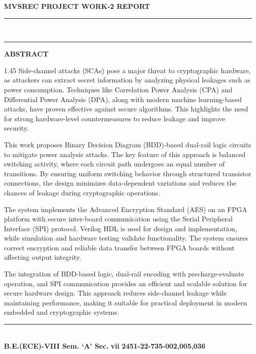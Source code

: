 \documentclass[12pt,a4paper]{article}
\begin{document}
\noindent
{\small\textbf{MVSREC}} \hfill {\small\textbf{PROJECT WORK-2 REPORT}}\\[-0.2cm]
\noindent\rule{\textwidth}{1.8pt}\\[-0.55cm]
\noindent\rule{\textwidth}{0.6pt}

\vspace{1.0cm}

\begin{center}
    {\fontsize{14}{17}\selectfont \textbf{ABSTRACT}}
\end{center}

\vspace{0.6cm}

\begin{spacing}{1.45}
\noindent
Side-channel attacks (SCAs) pose a major threat to cryptographic hardware, as attackers can extract secret information by analyzing physical leakages such as power consumption. Techniques like Correlation Power Analysis (CPA) and Differential Power Analysis (DPA), along with modern machine learning-based attacks, have proven effective against secure algorithms. This highlights the need for strong hardware-level countermeasures to reduce leakage and improve security.

\vspace{0.45cm}

\noindent
This work proposes Binary Decision Diagram (BDD)-based dual-rail logic circuits to mitigate power analysis attacks. The key feature of this approach is balanced switching activity, where each circuit path undergoes an equal number of transitions. By ensuring uniform switching behavior through structured transistor connections, the design minimizes data-dependent variations and reduces the chances of leakage during cryptographic operations.

\vspace{0.45cm}

\noindent
The system implements the Advanced Encryption Standard (AES) on an FPGA platform with secure inter-board communication using the Serial Peripheral Interface (SPI) protocol. Verilog HDL is used for design and implementation, while simulation and hardware testing validate functionality. The system ensures correct encryption and reliable data transfer between FPGA boards without affecting output integrity.

\vspace{0.45cm}

\noindent
The integration of BDD-based logic, dual-rail encoding with precharge-evaluate operation, and SPI communication provides an efficient and scalable solution for secure hardware design. This approach reduces side-channel leakage while maintaining performance, making it suitable for practical deployment in modern embedded and cryptographic systems.
\end{spacing}

\vfill

\noindent\rule{\textwidth}{0.8pt}\\[0.15cm]
\noindent
{\small\textbf{B.E.(ECE)-VIII Sem. `A' Sec.}} \hfill {\small\textbf{vii}} \hfill {\small\textbf{2451-22-735-002,005,036}}
\end{document}
